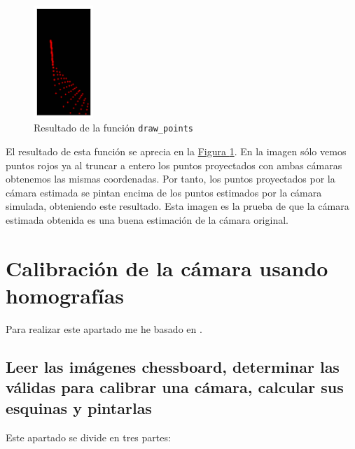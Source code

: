 \documentclass[11pt,a4paper]{article}
\theoremstyle{plain}
\theoremstyle{definition}
\begin{document}
\begin{figure}[!h]
    \centering
    \includegraphics[width=0.2\textwidth]{img1}
    \caption{Resultado de la función \texttt{draw\_points}}
    \label{drawpoints}
\end{figure}

El resultado de esta función se aprecia en la \hyperref[drawpoints]{Figura \ref*{drawpoints}}. En la imagen sólo vemos puntos rojos ya al truncar a entero los puntos proyectados con ambas cámaras obtenemos las mismas coordenadas. Por tanto, los puntos proyectados por la cámara estimada se pintan encima de los puntos estimados por la cámara simulada, obteniendo este resultado. Esta imagen es la prueba de que la cámara estimada obtenida es una buena estimación de la cámara original.

\section{Calibración de la cámara usando homografías}

Para realizar este apartado me he basado en \cite{cal}.

\subsection{Leer las imágenes chessboard, determinar las válidas para calibrar una cámara, calcular sus esquinas y pintarlas}

Este apartado se divide en tres partes:
\end{document}
